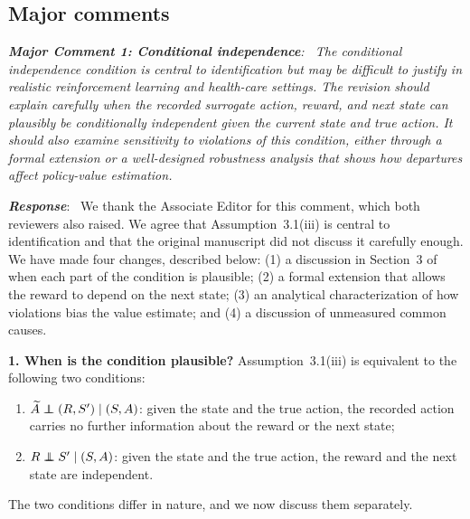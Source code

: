 \documentclass[12pt]{article}
\newcommand\independent{\protect\mathpalette{\protect\independenT}{\perp}}
\def\independenT#1#2{\mathrel{\rlap{$#1#2$}\mkern2mu{#1#2}}}
\newcommand{\0}{\boldsymbol{0}}
\theoremstyle{definition}
\newcommand{\reviewcomment}[1]{\par\begingroup\itshape\noindent\textbf{#1}:\ }
\newcommand{\reviewresponse}{\par\endgroup\noindent\textbf{\textit{Response}}:\ }
\begin{document}
\subsection*{Major comments}

\reviewcomment{Major Comment 1: Conditional independence} The conditional independence condition is central to identification but may be difficult to justify in realistic reinforcement learning and health-care settings. The revision should explain carefully when the recorded surrogate action, reward, and next state can plausibly be conditionally independent given the current state and true action. It should also examine sensitivity to violations of this condition, either through a formal extension or a well-designed robustness analysis that shows how departures affect policy-value estimation.
\reviewresponse
We thank the Associate Editor for this comment, which both reviewers also raised. We agree that Assumption~3.1(iii) is central to identification and that the original manuscript did not discuss it carefully enough. We have made four changes, described below: (1) a discussion in Section~3 of when each part of the condition is plausible; (2) a formal extension that allows the reward to depend on the next state; (3) an analytical characterization of how violations bias the value estimate; and (4) a discussion of unmeasured common causes.

\textbf{1. When is the condition plausible?} Assumption~3.1(iii) is equivalent to the following two conditions:
\begin{enumerate}[label=(\alph*)]
    \item $\widetilde A\independent (R,S')\mid (S,A)$: given the state and the true action, the recorded action carries no further information about the reward or the next state;
    \item $R\independent S'\mid (S,A)$: given the state and the true action, the reward and the next state are independent.
\end{enumerate}
The two conditions differ in nature, and we now discuss them separately.
\end{document}
